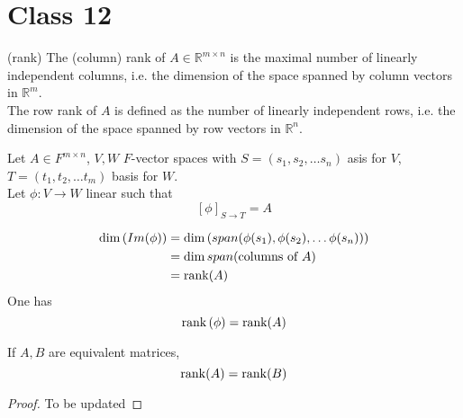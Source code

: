 \section{Class 12}

\begin{definition}
    (rank) The (column) rank of $A \in \mathbb{R}^{m \times n}$ is the maximal number of linearly independent columns, i.e. the dimension of the space spanned by column vectors in $\mathbb{R}^m$. \\

    The row rank of $A$ is defined as the number of linearly independent rows, i.e. the dimension of the space spanned by row vectors in $\mathbb{R}^n$.
\end{definition}

\begin{remark}
    Let $A \in F^{m \times n}$, $V, W$ $F$-vector spaces with $S = (s_1, s_2, \hdots s_n)$ asis for $V$, $T = (t_1, t_2, \hdots t_m)$ basis for $W$. \\

    Let $ \phi: V \to W$ linear such that 
    \[
        \left[ \phi \right]_{S \to T} = A
    \]

    \begin{align*}
        \dim \left( Im( \phi) \right)  &= \dim \left( span(\phi(s_1), \phi(s_2), \hdots \phi(s_n)) \right)  \\
        &= \dim span( \text{columns of } A) \\
        &= \rank(A)
    \end{align*}
    One has 
    \[
        \rank \left( \phi \right)  = \rank(A) 
    \]
\end{remark}

\begin{corollary}
    If $A, B$ are equivalent matrices, 
    \[
        \rank(A) = \rank(B)
    \]
\end{corollary}
\begin{proof} To be updated
\end{proof}

